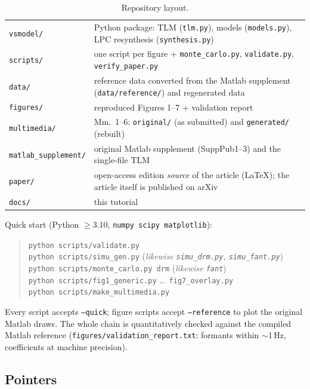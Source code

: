 \documentclass[11pt]{article}
\newcommand{\code}[1]{\texttt{#1}}
\theoremstyle{definition}
\theoremstyle{remark}
\begin{document}
\begin{table}[h]
\centering
\small
\begin{tabular}{@{}lp{10.2cm}@{}}
\toprule
\code{vsmodel/} & Python package: TLM (\code{tlm.py}), models
(\code{models.py}), LPC resynthesis (\code{synthesis.py})\\
\code{scripts/} & one script per figure + \code{monte\_carlo.py},
\code{validate.py}, \code{verify\_paper.py}\\
\code{data/} & reference data converted from the Matlab supplement
(\code{data/reference/}) and regenerated data\\
\code{figures/} & reproduced Figures 1--7 + validation report\\
\code{multimedia/} & Mm.~1--6: \code{original/} (as submitted) and
\code{generated/} (rebuilt)\\
\code{matlab\_supplement/} & original Matlab supplement (SuppPub1--3) and
the single-file TLM\\
\code{paper/} & open-access edition \emph{source} of the article
(LaTeX); the article itself is published on arXiv\\
\code{docs/} & this tutorial\\
\bottomrule
\end{tabular}
\caption{Repository layout.}
\end{table}

\noindent Quick start (Python $\ge$3.10, \code{numpy scipy matplotlib}):
\begin{quote}
\code{python scripts/validate.py}\\
\code{python scripts/simu\_gen.py} \quad(\emph{likewise
\code{simu\_drm.py}, \code{simu\_fant.py}})\\
\code{python scripts/monte\_carlo.py drm} \quad(\emph{likewise
\code{fant}})\\
\code{python scripts/fig1\_generic.py} \dots\ \code{fig7\_overlay.py}\\
\code{python scripts/make\_multimedia.py}
\end{quote}
Every script accepts \code{--quick}; figure scripts accept
\code{--reference} to plot the original Matlab draws.  The whole chain is
quantitatively checked against the compiled Matlab reference
(\code{figures/validation\_report.txt}: formants within $\sim$1\,Hz,
coefficients at machine precision).

\subsection{Pointers}
\end{document}
